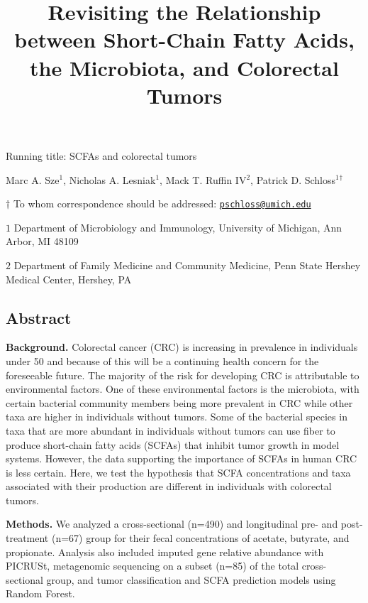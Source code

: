 \documentclass[11pt,]{article}
\title{Revisiting the Relationship between Short-Chain Fatty Acids, the
Microbiota, and Colorectal Tumors}
\author{}
\date{}
\begin{document}
\maketitle

\vspace{35mm}

Running title: SCFAs and colorectal tumors

\vspace{35mm}

Marc A. Sze\({^1}\), Nicholas A. Lesniak\({^1}\), Mack T. Ruffin
IV\({^2}\), Patrick D. Schloss\({^1}\)\({^\dagger}\)

\vspace{40mm}

\(\dagger\) To whom correspondence should be addressed:
\href{mailto:pschloss@umich.edu}{\nolinkurl{pschloss@umich.edu}}

\(1\) Department of Microbiology and Immunology, University of Michigan,
Ann Arbor, MI 48109

\(2\) Department of Family Medicine and Community Medicine, Penn State
Hershey Medical Center, Hershey, PA

\newpage

\linenumbers

\subsection{Abstract}\label{abstract}

\textbf{Background.} Colorectal cancer (CRC) is increasing in prevalence
in individuals under 50 and because of this will be a continuing health
concern for the foreseeable future. The majority of the risk for
developing CRC is attributable to environmental factors. One of these
environmental factors is the microbiota, with certain bacterial
community members being more prevalent in CRC while other taxa are
higher in individuals without tumors. Some of the bacterial species in
taxa that are more abundant in individuals without tumors can use fiber
to produce short-chain fatty acids (SCFAs) that inhibit tumor growth in
model systems. However, the data supporting the importance of SCFAs in
human CRC is less certain. Here, we test the hypothesis that SCFA
concentrations and taxa associated with their production are different
in individuals with colorectal tumors.

\textbf{Methods.} We analyzed a cross-sectional (n=490) and longitudinal
pre- and post-treatment (n=67) group for their fecal concentrations of
acetate, butyrate, and propionate. Analysis also included imputed gene
relative abundance with PICRUSt, metagenomic sequencing on a subset
(n=85) of the total cross-sectional group, and tumor classification and
SCFA prediction models using Random Forest.
\end{document}

